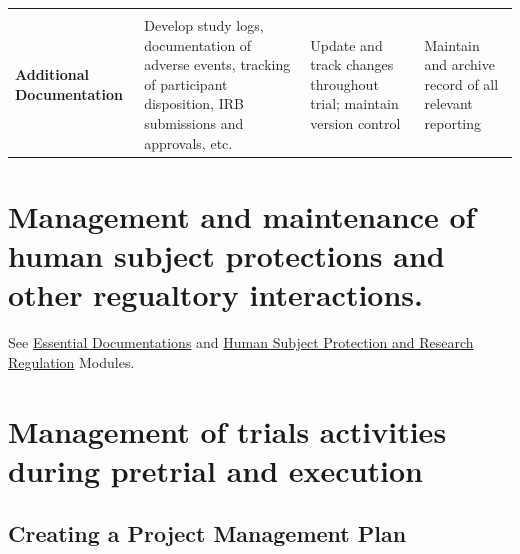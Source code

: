 \documentclass[]{book}
\theoremstyle{definition}
\theoremstyle{definition}
\theoremstyle{definition}
\theoremstyle{remark}
\begin{document}
\begin{longtable}[]{@{}llll@{}}
\begin{minipage}[t]{0.21\columnwidth}
\end{minipage} & \begin{minipage}[t]{0.25\columnwidth}\raggedright\strut
\strut
\end{minipage}\tabularnewline
\begin{minipage}[t]{0.19\columnwidth}\raggedright\strut
\textbf{Additional Documentation}\strut
\end{minipage} & \begin{minipage}[t]{0.23\columnwidth}\raggedright\strut
Develop study logs, documentation of adverse events, tracking of
participant disposition, IRB submissions and approvals, etc.\strut
\end{minipage} & \begin{minipage}[t]{0.21\columnwidth}\raggedright\strut
Update and track changes throughout trial; maintain version
control\strut
\end{minipage} & \begin{minipage}[t]{0.25\columnwidth}\raggedright\strut
Maintain and archive record of all relevant reporting\strut
\end{minipage}\tabularnewline
\bottomrule
\end{longtable}

\section{Management and maintenance of human subject protections and
other regualtory
interactions.}\label{management-and-maintenance-of-human-subject-protections-and-other-regualtory-interactions.}

See
\href{https://ifar-isac.github.io/book/essential-documentations.html}{Essential
Documentations} and
\href{https://ifar-isac.github.io/book/human-subject-protection-and-research-regulation.html}{Human
Subject Protection and Research Regulation} Modules.

\section{Management of trials activities during pretrial and
execution}\label{management-of-trials-activities-during-pretrial-and-execution}

\subsection{Creating a Project Management
Plan}\label{creating-a-project-management-plan}
\end{document}
